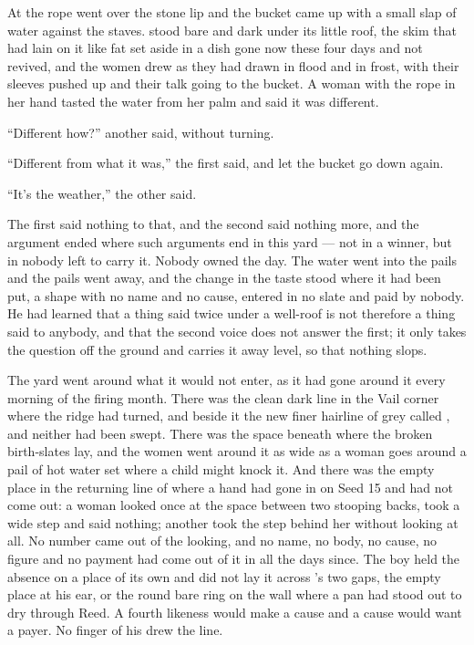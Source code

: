 \scenebreak

At  the rope went over the stone lip and the bucket came up with a small slap of water against the staves.  stood bare and dark under its little roof, the skim that had lain on it like fat set aside in a dish gone now these four days and not revived, and the women drew as they had drawn in flood and in frost, with their sleeves pushed up and their talk going to the bucket. A woman with the rope in her hand tasted the water from her palm and said it was different.

“Different how?” another said, without turning.

“Different from what it was,” the first said, and let the bucket go down again.

“It's the weather,” the other said.

The first said nothing to that, and the second said nothing more, and the argument ended where such arguments end in this yard --- not in a winner, but in nobody left to carry it. Nobody owned the day. The water went into the pails and the pails went away, and the change in the taste stood where it had been put, a shape with no name and no cause, entered in no slate and paid by nobody. He had learned that a thing said twice under a well-roof is not therefore a thing said to anybody, and that the second voice does not answer the first; it only takes the question off the ground and carries it away level, so that nothing slops.

\scenebreak

The yard went around what it would not enter, as it had gone around it every morning of the firing month. There was the clean dark line in the Vail corner where the  ridge had turned, and beside it the new finer hairline of grey called , and neither had been swept. There was the space beneath  where the broken birth-slates lay, and the women went around it as wide as a woman goes around a pail of hot water set where a child might knock it. And there was the empty place in the returning line of  where a hand had gone in on Seed 15 and had not come out: a woman looked once at the space between two stooping backs, took a wide step and said nothing; another took the step behind her without looking at all. No number came out of the looking, and no name, no body, no cause, no figure and no payment had come out of it in all the days since. The boy held the absence on a place of its own and did not lay it across 's two gaps, the empty place at his ear, or the round bare ring on the wall where a pan had stood out to dry through Reed. A fourth likeness would make a cause and a cause would want a payer. No finger of his drew the line.

